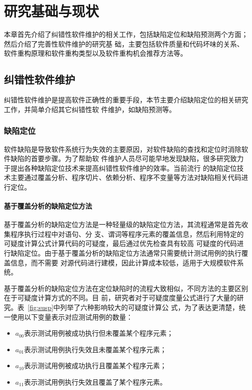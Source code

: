 
\chapter{研究基础与现状}
本章首先介绍了纠错性软件维护的相关工作，包括缺陷定位和缺陷预测两个方面；然后介绍了完善性软件维护的研究基
础，主要包括软件质量和代码坏味的关系、软件重构原理和软件重构类型以及软件重构机会推荐方法等。
\section{纠错性软件维护}
纠错性软件维护是提高软件正确性的重要手段，本节主要介绍缺陷定位的相关研究工作，并简单介绍其它纠错性软
件维护，如缺陷预测等。

\subsection{缺陷定位}
软件缺陷是导致软件系统行为失效的主要原因，对软件缺陷的查找和定位时消除软件缺陷的首要步骤。为了帮助软
件维护人员尽可能早地发现缺陷，很多研究致力于提出各种缺陷定位技术来提高纠错性软件维护的效率。当前流行
的缺陷定位技术主要通过覆盖分析、程序切片、依赖分析、程序不变量等方法对缺陷相关代码进行定位。

\subsubsection{基于覆盖分析的缺陷定位方法}
基于覆盖分析的缺陷定位方法是一种轻量级的缺陷定位方法，其流程通常是首先收集程序执行过程中对语句、分
支、谓词等程序元素的覆盖信息，然后利用特定的可疑度计算公式计算代码的可疑度，最后通过优先检查具有较高
可疑度的代码进行缺陷定位。由于基于覆盖分析的缺陷定位方法通常只需要统计测试用例的执行覆盖信息，而不需要
对源代码进行建模，因此计算成本较低，适用于大规模软件系统。

基于覆盖分析的缺陷定位方法在定位缺陷时的流程大致相似，不同方法的主要区别在于可疑度计算方式的不同。目
前，研究者对于可疑度度量公式进行了大量的研究。表~\ref{fig:susp}中列举了六种影响较大的可疑度计算公
式，为了表达更清楚，统一使用以下变量表示对应测试用例的数量：
\begin{itemize}
  \item $a_{00}$表示测试用例被成功执行但未覆盖某个程序元素；
  \item $a_{01}$表示测试用例执行失效且未覆盖某个程序元素；
  \item $a_{10}$表示测试用例被成功执行且覆盖某个程序元素；
  \item $a_{11}$表示测试用例执行失效且覆盖了某个程序元素。
\end{itemize}

